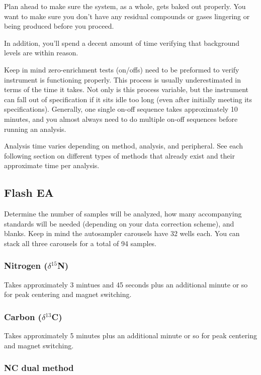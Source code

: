 \documentclass[12pt]{../SOP3}\usepackage[]{graphicx}\usepackage[]{color}
\begin{document}
\NP Plan ahead to make sure the system, as a whole, gets baked out properly. You want to make sure you don't have any residual compounds or gases lingering or being produced before you proceed.

\NP In addition, you'll spend a decent amount of time verifying that background levels are within reason. 

\NP Keep in mind zero-enrichment tests (on/offs) need to be preformed to verify instrument is functioning properly. This process is usually underestimated in terms of the time it takes. Not only is this process variable, but the instrument can fall out of specification if it sits idle too long (even after initially meeting its specifications). Generally, one single on-off sequence takes approximately 10 minutes, and you almost always need to do multiple on-off sequences before running an analysis.

\NP Analysis time varies depending on method, analysis, and peripheral. See each following section on different types of methods that already exist and their approximate time per analysis.

\subsection{Flash EA}

\NP Determine the number of samples will be analyzed, how many accompanying standards will be needed (depending on your data correction scheme), and blanks. Keep in mind the autosampler carousels have 32 wells each. You can stack all three carousels for a total of 94 samples.

\subsubsection{Nitrogen ($\delta$$^{15}$N)}

\NP Takes approximately 3 mintues and 45 seconds plus an additional minute or so for peak centering and magnet switching.

\subsubsection{Carbon ($\delta$$^{13}$C)}

\NP Takes approximately 5 minutes plus an additional minute or so for peak centering and magnet switching.

\subsubsection{NC dual method}
\end{document}
